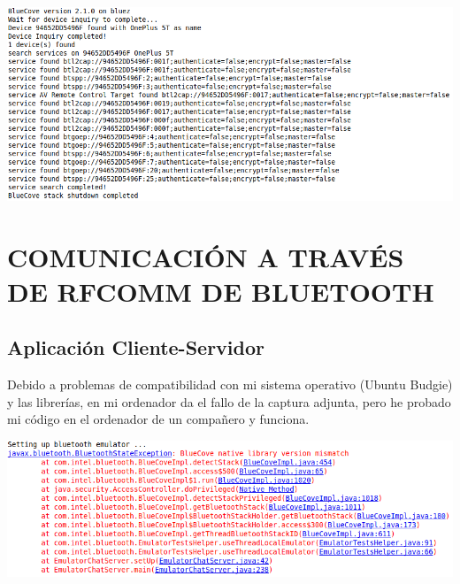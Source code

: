 \documentclass{article}
\begin{document}
\begin{flushleft}
	\includegraphics[scale=0.5]{imagenes/Ex7DeviceAndService.png} 
\end{flushleft}

\section{COMUNICACIÓN A TRAVÉS DE RFCOMM DE BLUETOOTH}

\subsection{Aplicación Cliente-Servidor}

Debido a problemas de compatibilidad con mi sistema operativo (Ubuntu Budgie) y las librerías, en mi ordenador da el fallo de la captura adjunta, pero he probado mi código en el ordenador de un compañero y funciona.

\begin{flushleft}
	\includegraphics[scale=0.5]{imagenes/chat.png} 
\end{flushleft}
\end{document}
